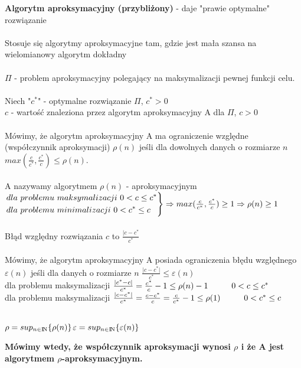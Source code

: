 \textbf{Algorytm aproksymacyjny (przybliżony)} - daje "prawie optymalne" rozwiązanie\\
\\
Stosuje się algorytmy  aproksymacyjne tam, gdzie jest mała szansa na wielomianowy algorytm dokładny\\
\\
$\Pi$ - problem aproksymacyjny polegający na maksymalizacji pewnej funkcji celu.\\\\
Niech "$c^{\ast}$" - optymalne rozwiązanie $\Pi$, $c^{\ast} > 0$\\
\tab $c$ - wartość znaleziona przez algorytm aproksymacyjny A dla $\Pi$, $c>0$\\\\
Mówimy, że algorytm aproksymacyjny A ma ograniczenie względne (współczynnik aproksymacji) $\rho (n)$ jeśli dla dowolnych danych o rozmiarze $n$ $max(\frac{c}{c^{\ast}},\frac{c^{\ast}}{c}) \leq \rho (n)$. \\\\
A nazywamy algorytmem $\rho(n)$ - aproksymacyjnym \\
$\begin{drcases}
dla\ problemu\ maksymalizacji\ 0<c\leq c^{\ast}\\
dla\ problemu\ minimalizacji\ 0<c^{\ast}\leq c
\end{drcases} \Rightarrow max(\frac{c}{c^{\ast}},\frac{c^{\ast}}{c})\geq 1 \Rightarrow \rho(n) \geq 1$\\\\
Błąd względny rozwiązania $c$ to $\frac{\vert c-c^{\ast}}{c^{\ast}}$\\\\
Mówimy, że algorytm aproksymacyjny  A posiada ograniczenia błędu  względnego $\varepsilon (n)$ jeśli dla danych o rozmiarze $n$ $\frac{\vert c-c^{\ast}\vert}{c^{\ast}} \leq \varepsilon (n)$ \\
dla problemu maksymalizacji $\frac{\vert c^{\ast} - c\vert}{c^{\ast}} = \frac{c^{\ast}}{c} - 1 \leq \rho(n) - 1 \hspace*{1cm} 0<c\leq c^{\ast}$\\
dla problemu maksymalizacji $\frac{\vert c - c^{\ast}\vert}{c^{\ast}} = \frac{c - c^{\ast}}{c} = \frac{c}{c^{\ast}} - 1 \leq \rho(1) \hspace*{1cm} 0<c^{\ast}\leq c$\\\\
\begin{center}
$\rho = sup_{n \in {\rm I\!N}}\lbrace\rho (n) \rbrace$\tab $\varepsilon = sup_{n \in {\rm I\!N}}\lbrace\varepsilon (n) \rbrace$
\end{center}
\textbf{Mówimy wtedy, że współczynnik aproksymacji wynosi $\rho$ i że A jest algorytmem $\rho$-aproksymacyjnym.}